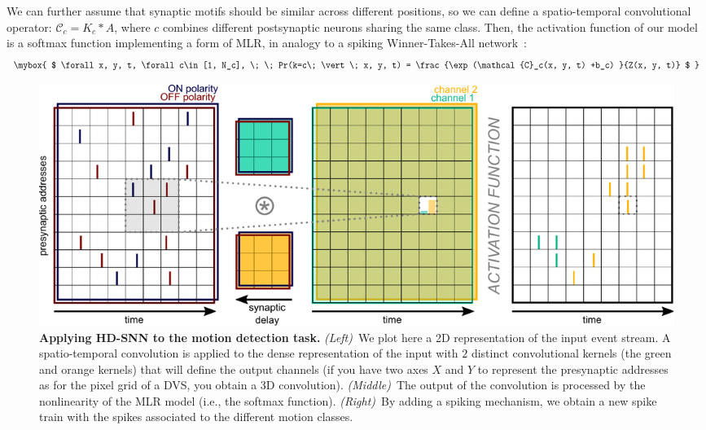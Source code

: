 \documentclass[landscape,a0]{a0poster}
\newcommand{\bias}{b} %
\newcommand{\timev}{t} %
\newcommand{\kernel}{K} %
\newcommand{\class}{c} %
\begin{document}
\begin{multicols}{3}
\noindent We can further assume that synaptic motifs should be similar across different positions, so we can define a spatio-temporal convolutional operator: $\mathcal{C}_\class = \kernel_\class \ast A$, where $\class$ combines different postsynaptic neurons sharing the same class. Then, the activation function of our model is a softmax function implementing a form of MLR, in analogy to a spiking Winner-Takes-All network~\cite{nessler_bayesian_2013}:
$$
\mybox{
$ \forall x, y, \timev, \forall \class \in [1, N_\class], \; \;
Pr(k=\class \; \vert \;  x, y, \timev) =
\frac {\exp  (\mathcal{C}_\class(x, y, \timev) +\bias_\class) }{Z(x, y, \timev)}
$
}
$$
%
\vspace{1cm}
%
\begin{figure}[H]
    \centering
    \includegraphics[width=\linewidth]{figures/HDSNN_conv.pdf}
    \caption{
    \textbf{Applying HD-SNN to the motion detection task.} \textit{(Left)}~We plot here a 2D representation of the input event stream. A spatio-temporal convolution is applied to the dense representation of the input with $2$ distinct convolutional kernels (the green and orange kernels) that will define the output channels (if you have two axes $X$ and $Y$ to represent the presynaptic addresses as for the pixel grid of a DVS, you obtain a 3D convolution). \textit{(Middle)}~The output of the convolution is processed by the nonlinearity of the MLR model (i.e., the softmax function). \textit{(Right)}~By adding a spiking mechanism, we obtain a new spike train with the spikes associated to the different motion classes.}

\end{figure}
\end{multicols}
\end{document}
